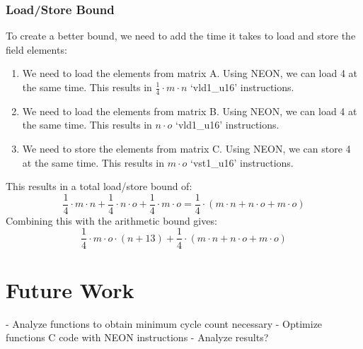 \documentclass[a4paper]{article}
\begin{document}
\subsubsection{Load/Store Bound}
To create a better bound, we need to add the time it takes to load and store the field elements:
\begin{enumerate}
    \item We need to load the elements from matrix A. Using NEON, we can load 4 at the same time. This results in $\frac{1}{4} \cdot m \cdot n$ `vld1\_u16' instructions.
    \item We need to load the elements from matrix B. Using NEON, we can load 4 at the same time. This results in $n \cdot o$ `vld1\_u16' instructions.
    \item We need to store the elements from matrix C. Using NEON, we can store 4 at the same time. This results in $m \cdot o$ `vst1\_u16' instructions.
\end{enumerate}
This results in a total load/store bound of:
\[
    \frac{1}{4} \cdot m \cdot n + \frac{1}{4} \cdot n \cdot o + \frac{1}{4} \cdot m \cdot o = \frac{1}{4} \cdot (m \cdot n + n \cdot o + m \cdot o)
\]
Combining this with the arithmetic bound gives:
\[
    \frac{1}{4} \cdot m \cdot o \cdot (n + 13) + \frac{1}{4} \cdot (m \cdot n + n \cdot o + m \cdot o)
\]

\section{Future Work}
- Analyze functions to obtain minimum cycle count necessary
- Optimize functions C code with NEON instructions
- Analyze results?
\end{document}
